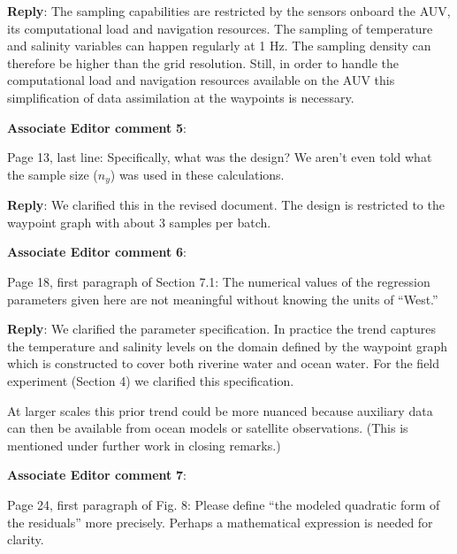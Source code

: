 \documentclass[a4paper]{article}
\def\aecom{\textbf{Associate Editor comment }}
\def\reply{\textbf{Reply}}
\begin{document}
\reply: The sampling capabilities are restricted by the sensors onboard the AUV, its computational load and navigation resources. The sampling of temperature and salinity variables can happen regularly at 1 Hz. The sampling density can therefore be higher than the grid resolution. Still, in order to handle the computational load and navigation resources available on the AUV this simplification of data assimilation at the waypoints is necessary. %
\vspace{1em}

\vspace{5mm}
\noindent \aecom \textbf{5}:

Page 13, last line: Specifically, what was the design? We aren’t even told what the sample size ($n_y$) was used in these calculations.\par

\reply: We clarified this in the revised document. The design is restricted to the waypoint graph with about 3 samples per batch.  

\vspace{1em}

\vspace{5mm}
\noindent \aecom \textbf{6}:

Page 18, first paragraph of Section 7.1: The numerical values of the regression parameters given here are not meaningful without knowing the units of “West.”\par

\reply: We clarified the parameter specification.
In practice the trend captures the temperature and salinity levels on the domain defined by the waypoint graph which is constructed to cover both riverine water and ocean water. For the field experiment (Section 4) we clarified this specification.

At larger scales this prior trend could be more nuanced because auxiliary data can then be available from ocean models or satellite observations. (This is mentioned under further work in closing remarks.)

\vspace{1em}

\vspace{5mm}
\noindent \aecom \textbf{7}:

Page 24, first paragraph of Fig. 8: Please define “the modeled quadratic form of the residuals” more precisely. Perhaps a mathematical expression is needed for clarity.\par
\end{document}
